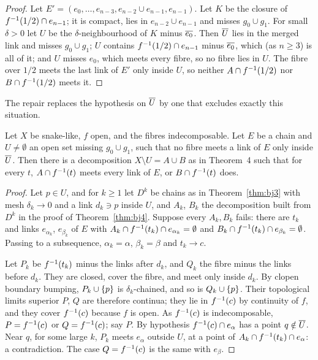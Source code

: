 \begin{proof}
Let $E'=(e_0,\dots,e_{n-3},e_{n-2}\cup e_{n-1},e_{n-1})$. Let $K$ be the closure of $f^{-1}(1/2)\cap e_{n-1}$; it is compact, lies in $e_{n-2}\cup e_{n-1}$ and
misses $g_0\cup g_1$. For small $\delta>0$ let $U$ be the $\delta$-neighbourhood of $K$ minus $\overline{e_0}$. Then $\overline{U}$ lies in the merged link and misses
$g_0\cup g_1$; $U$ contains $f^{-1}(1/2)\cap e_{n-1}$ minus $\overline{e_0}$, which (as $n\ge3$) is all of it; and $U$ misses $e_0$, which meets every fibre, so no
fibre lies in $U$. The fibre over $1/2$ meets the last link of $E'$ only inside $U$, so neither $A\cap f^{-1}(1/2)$ nor $B\cap f^{-1}(1/2)$ meets it.
\end{proof}


The repair replaces the hypothesis on $\overline{U}$ by one that excludes exactly this situation.

\begin{theorem}\label{thm:bj5}
Let $X$ be snake-like, $f$ open, and the fibres indecomposable. Let $E$ be a chain and $U\ne\emptyset$ an open set missing $g_0\cup g_1$, such that no fibre meets
a link of $E$ only inside $\overline{U}$. Then there is a decomposition $X\setminus U=A\cup B$ as in Theorem~4 such that for every $t$, $A\cap f^{-1}(t)$ meets every link
of $E$, or $B\cap f^{-1}(t)$ does.
\end{theorem}

\begin{proof}
Let $p\in U$, and for $k\ge1$ let $D^k$ be chains as in Theorem~\ref{thm:bj3} with mesh $\delta_k\to0$ and a link $d_k\ni p$ inside $U$, and $A_k$, $B_k$ the
decomposition built from $D^k$ in the proof of Theorem~\ref{thm:bj4}. Suppose every $A_k,B_k$ fails: there are $t_k$ and links $e_{\alpha_k}$, $e_{\beta_k}$ of
$E$ with $A_k\cap f^{-1}(t_k)\cap e_{\alpha_k}=\emptyset$ and $B_k\cap f^{-1}(t_k)\cap e_{\beta_k}=\emptyset$. Passing to a subsequence, $\alpha_k=\alpha$,
$\beta_k=\beta$ and $t_k\to c$.

Let $P_k$ be $f^{-1}(t_k)$ minus the links after $d_k$, and $Q_k$ the fibre minus the links before $d_k$. They are closed, cover the fibre, and meet only inside
$d_k$. By clopen boundary bumping, $P_k\cup\left\{ p \right\}$ is $\delta_k$-chained, and so is $Q_k\cup\left\{ p \right\}$. Their topological limits superior $P$, $Q$ are therefore
continua; they lie in $f^{-1}(c)$ by continuity of $f$, and they cover $f^{-1}(c)$ because $f$ is open. As $f^{-1}(c)$ is indecomposable, $P=f^{-1}(c)$ or $Q=f^{-1}(c)$; say $P$. By hypothesis $f^{-1}(c)\cap e_\alpha$ has a point $q\notin\overline{U}$. Near $q$, for some large $k$, $P_k$ meets $e_\alpha$ outside $U$, at a point of
$A_k\cap f^{-1}(t_k)\cap e_\alpha$: a contradiction. The case $Q=f^{-1}(c)$ is the same with $e_\beta$.
\end{proof}

